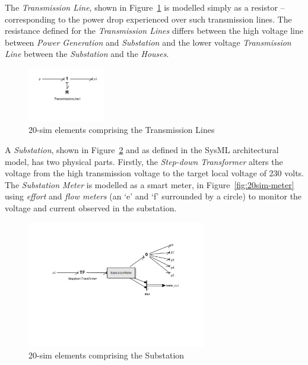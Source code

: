 \begin{description}
The \textit{Transmission Line}, shown in Figure~\ref{fig:20sim-transmission} is modelled simply as a resistor -- corresponding to the power drop experienced over such transmission lines. The resistance defined for the \textit{Transmission Lines} differs between the high voltage line between \textit{Power Generation} and \textit{Substation} and the lower voltage \textit{Transmission Line} between the \textit{Substation} and the \textit{Houses}.


\begin{figure}[htb]
\begin{center}
\includegraphics[width=0.3\textwidth]{smartgrid/20-sim-transmission.pdf}
\caption{20-sim elements comprising the Transmission Lines}
\label{fig:20sim-transmission}
\end{center}
\end{figure}

A \textit{Substation}, shown in Figure~\ref{fig:20sim-substation}  and as defined in the SysML architectural model, has two physical parts. Firstly, the \textit{Step-down Transformer} alters the voltage from the high transmission voltage to the target local voltage of 230 volts. The \textit{Substation Meter} is modelled as a smart meter, in Figure~\ref{fig:20sim-meter} using \emph{effort} and \emph{flow meters} (an `e' and `f' surrounded by a circle) to monitor the voltage and current observed in the substation.

\begin{figure}[htb]
\begin{center}
\includegraphics[width=0.7\textwidth]{smartgrid/20-sim-substation.pdf}
\caption{20-sim elements comprising the Substation}
\label{fig:20sim-substation}
\end{center}
\end{figure}


\end{description}
